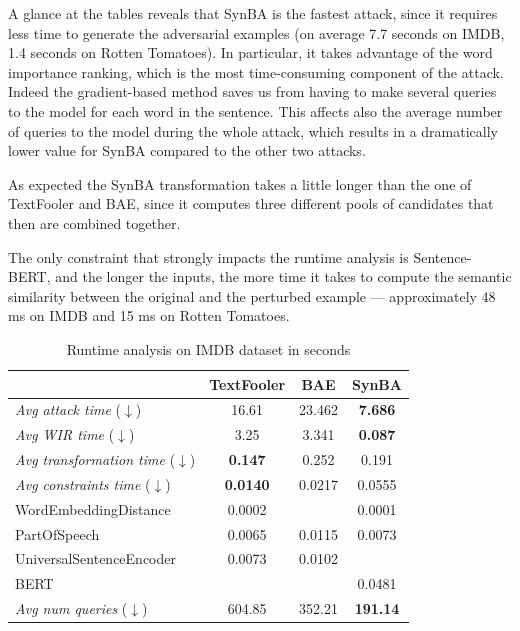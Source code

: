 A glance at the tables reveals that SynBA is the fastest attack, since it requires less time to generate the adversarial examples (on average 7.7 seconds on IMDB, 1.4 seconds on Rotten Tomatoes).
In particular, it takes advantage of the word importance ranking, which is the most time-consuming component of the attack. Indeed the gradient-based method saves us from having to make several queries to the model for each word in the sentence.
This affects also the average number of queries to the model during the whole attack, which results in a dramatically lower value for SynBA compared to the other two attacks.

As expected the SynBA transformation takes a little longer than the one of TextFooler and BAE, since it computes three different pools of candidates that then are combined together.

The only constraint that strongly impacts the runtime analysis is Sentence-BERT, and the longer the inputs, the more time it takes to compute the semantic similarity between the original and the perturbed example --- approximately 48 ms on IMDB and 15 ms on Rotten Tomatoes.

\begin{table}[h]
    \footnotesize
    \centering
    \begin{tabular}{|l||c|c|c|}
        \hline
        {} &            \textbf{TextFooler} &   \textbf{BAE} &    \textbf{SynBA} \\
        \hline \hline
        \emph{Avg attack time}  ($\downarrow$)          &      16.61 &     23.462 &     \textbf{7.686} \\
        \hline
        \emph{Avg WIR time} ($\downarrow$)        &       3.25 &      3.341 &    \textbf{0.087} \\
        \hline
        \emph{Avg transformation time} ($\downarrow$)      &      \textbf{0.147} &      0.252 &     0.191 \\
        \hline
        \emph{Avg constraints time} ($\downarrow$)   &   \textbf{0.0140}      &   0.0217       &   0.0555       \\      
        WordEmbeddingDistance        &  0.0002 &          &   0.0001 \\
        PartOfSpeech                 &  0.0065 &  0.0115  &   0.0073 \\
        UniversalSentenceEncoder     &  0.0073 &  0.0102  &          \\
        BERT                         &         &          &   0.0481 \\
        \hline
        \emph{Avg num queries} ($\downarrow$)             &    604.85 &      352.21 &     \textbf{191.14} \\
        \hline
        \end{tabular}
    \caption{Runtime analysis on IMDB dataset in seconds}
    \label{tab:runtime-imdb}
\end{table}


